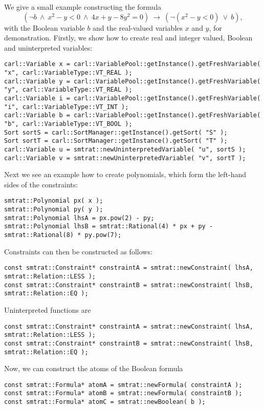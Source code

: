 We give a small example constructing the formula \[(\neg b\ \land\ x^2-y<0\ \land\ 4x+y-8y^2=0 )\ \rightarrow\ (\neg(x^2-y<0)\ \lor\ b ),\] with the Boolean variable $b$ and the real-valued variables $x$ and $y$, for demonstration. Firstly, we show how to create real and integer valued, Boolean and uninterpreted variables:
\scriptsize
\begin{verbatim}
carl::Variable x = carl::VariablePool::getInstance().getFreshVariable( "x", carl::VariableType::VT_REAL );
carl::Variable y = carl::VariablePool::getInstance().getFreshVariable( "y", carl::VariableType::VT_REAL );
carl::Variable i = carl::VariablePool::getInstance().getFreshVariable( "i", carl::VariableType::VT_INT );
carl::Variable b = carl::VariablePool::getInstance().getFreshVariable( "b", carl::VariableType::VT_BOOL );
Sort sortS = carl::SortManager::getInstance().getSort( "S" );
Sort sortT = carl::SortManager::getInstance().getSort( "T" );
carl::Variable u = smtrat::newUninterpretedVariable( "u", sortS );
carl::Variable v = smtrat::newUninterpretedVariable( "v", sortT );
\end{verbatim}
\normalsize
Next we see an example how to create polynomials, which form the left-hand sides of the constraints:
\scriptsize
\begin{verbatim}
smtrat::Polynomial px( x );
smtrat::Polynomial py( y );
smtrat::Polynomial lhsA = px.pow(2) - py;
smtrat::Polynomial lhsB = smtrat::Rational(4) * px + py - smtrat::Rational(8) * py.pow(7);
\end{verbatim}
\normalsize
Constraints can then be constructed as follows:
\scriptsize
\begin{verbatim}
const smtrat::Constraint* constraintA = smtrat::newConstraint( lhsA, smtrat::Relation::LESS );
const smtrat::Constraint* constraintB = smtrat::newConstraint( lhsB, smtrat::Relation::EQ );
\end{verbatim}
\normalsize
Uninterpreted functions are 
\scriptsize
\begin{verbatim}
const smtrat::Constraint* constraintA = smtrat::newConstraint( lhsA, smtrat::Relation::LESS );
const smtrat::Constraint* constraintB = smtrat::newConstraint( lhsB, smtrat::Relation::EQ );
\end{verbatim}
\normalsize
Now, we can construct the atoms of the Boolean formula
\scriptsize
\begin{verbatim}
const smtrat::Formula* atomA = smtrat::newFormula( constraintA );
const smtrat::Formula* atomB = smtrat::newFormula( constraintB );
const smtrat::Formula* atomC = smtrat::newBoolean( b );
\end{verbatim}
